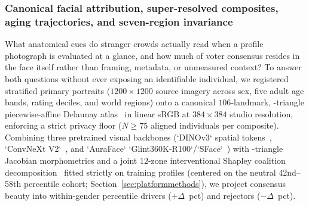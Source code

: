 \subsubsection{Canonical facial attribution, super-resolved composites, aging trajectories, and seven-region invariance}\label{sec:faceattr}
What anatomical cues do stranger crowds actually read when a profile photograph is evaluated at a glance, and how much of
voter consensus resides in the face itself rather than framing, metadata, or unmeasured context? To answer both questions
without ever exposing an identifiable individual, we registered \PboFaceTotalN{} stratified primary portraits ($1200\times
1200$ source imagery across sex, five adult age bands, rating deciles, and \PboFaceWorldRegionsN{} world regions) onto a
canonical $106$-landmark, \PboFaceTrisN-triangle piecewise-affine Delaunay atlas~\cite{deng2019arcface} in linear sRGB at
$384\times 384$ studio resolution, enforcing a strict privacy floor ($N\ge 75$ aligned individuals per composite). Combining
three pretrained visual backbones (`DINOv3` spatial tokens~\cite{oquab2024dinov2}, `ConvNeXt V2`~\cite{woo2023convnextv2},
and `AuraFace` `Glint360K-R100`/`SFace`~\cite{deng2019arcface}) with \PboFaceTrisN-triangle Jacobian morphometrics and a
joint $12$-zone interventional Shapley coalition decomposition~\cite{lundberg2017shap} fitted strictly on training profiles
(centered on the neutral 42nd--58th percentile cohort; Section~\ref{sec:platformmethods}), we project consensus beauty into
within-gender percentile drivers ($+\Delta$~pct) and rejectors ($-\Delta$~pct).

